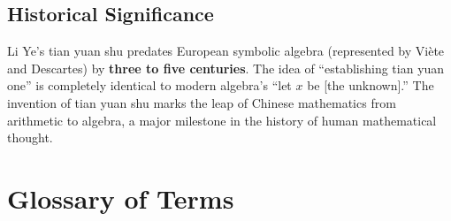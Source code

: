 \documentclass[11pt,a4paper]{book}
\begin{document}
\section{Historical Significance}

Li Ye's tian yuan shu predates European symbolic algebra (represented by Vi\`ete and Descartes) by \textbf{three to five centuries}. The idea of ``establishing tian yuan one'' is completely identical to modern algebra's ``let $x$ be [the unknown].'' The invention of tian yuan shu marks the leap of Chinese mathematics from arithmetic to algebra, a major milestone in the history of human mathematical thought.

\chapter{Glossary of Terms}
\label{app:glossary}
\end{document}

